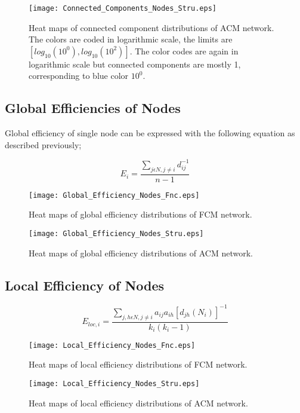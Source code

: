 \documentclass[12pt]{article}
\begin{document}
\newpage

\begin{figure}[h!]
	\centering
	\texttt{[image: Connected\_Components\_Nodes\_Stru.eps]}
	\caption{Heat maps of connected component distributions of ACM network. The colors are coded in logarithmic scale, the limits are $[log_{10}(10^0), log_{10}(10^2)]$. The color codes are again in logarithmic scale but connected components are mostly 1, corresponding to blue color $10^0$.}
\end{figure} 

\newpage

\subsection{Global Efficiencies of Nodes}
Global efficiency of single node can be expressed with the following equation as described previously; 

\begin{equation}
 E_i =  \frac{\sum\limits_{j \epsilon N, j\neq i}d_{ij}^{-1}}{n-1 }
\end{equation}



\begin{figure}[h!]
	\centering
	\texttt{[image: Global\_Efficiency\_Nodes\_Fnc.eps]}
	\caption{Heat maps of global efficiency distributions of FCM network.}
\end{figure}

\newpage 


\begin{figure}[h!]
	\centering
	\texttt{[image: Global\_Efficiency\_Nodes\_Stru.eps]}
	\caption{Heat maps of global efficiency distributions of ACM network.}
\end{figure}

\newpage 

\subsection{Local Efficiency of Nodes}

\begin{equation}
 E_{loc,i} = \frac{\sum\limits_{j,h \epsilon N, j\neq i} a_{ij} a_{ih}[d_{jh}(N_i)]^{-1}}{k_i(k_i - 1) }
\end{equation}




\begin{figure}[h!]
	\centering
	\texttt{[image: Local\_Efficiency\_Nodes\_Fnc.eps]}
	\caption{Heat maps of local efficiency distributions of FCM network.}
\end{figure}

\begin{figure}[h!]
	\centering
	\texttt{[image: Local\_Efficiency\_Nodes\_Stru.eps]}
	\caption{Heat maps of local efficiency distributions of ACM network.}
\end{figure}
\end{document}
